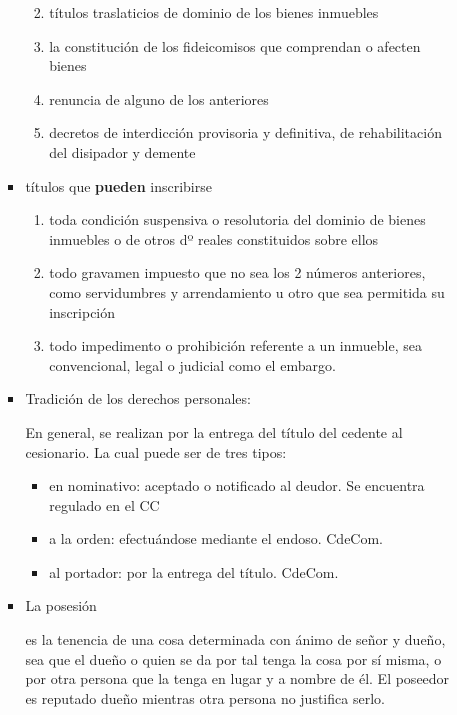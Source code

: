 \documentclass[]{article}
\providecommand{\tightlist}{%
  \setlength{\itemsep}{0pt}\setlength{\parskip}{0pt}}
\begin{document}
\begin{itemize}
\begin{itemize}
\begin{itemize}
      \begin{enumerate}
      \def\labelenumi{\arabic{enumi}.}
      \tightlist
      \item
        títulos traslaticios de dominio de los bienes inmuebles
      \item
        la constitución de los fideicomisos que comprendan o afecten
        bienes
      \item
        renuncia de alguno de los anteriores
      \item
        decretos de interdicción provisoria y definitiva, de
        rehabilitación del disipador y demente
      \end{enumerate}
    \item
      títulos que \textbf{pueden} inscribirse

      \begin{enumerate}
      \def\labelenumi{\arabic{enumi}.}
      \tightlist
      \item
        toda condición suspensiva o resolutoria del dominio de bienes
        inmuebles o de otros dº reales constituidos sobre ellos
      \item
        todo gravamen impuesto que no sea los 2 números anteriores, como
        servidumbres y arrendamiento u otro que sea permitida su
        inscripción
      \item
        todo impedimento o prohibición referente a un inmueble, sea
        convencional, legal o judicial como el embargo.
      \end{enumerate}
    \item
      Tradición de los derechos personales:

      En general, se realizan por la entrega del título del cedente al
      cesionario. La cual puede ser de tres tipos:

      \begin{itemize}
      \tightlist
      \item
        en nominativo: aceptado o notificado al deudor. Se encuentra
        regulado en el CC
      \item
        a la orden: efectuándose mediante el endoso. CdeCom.
      \item
        al portador: por la entrega del título. CdeCom.
      \end{itemize}
    \item
      La posesión

      es la tenencia de una cosa determinada con ánimo de señor y dueño,
      sea que el dueño o quien se da por tal tenga la cosa por sí misma,
      o por otra persona que la tenga en lugar y a nombre de él. El
      poseedor es reputado dueño mientras otra persona no justifica
      serlo.


\end{itemize}
\end{itemize}
\end{itemize}
\end{document}
